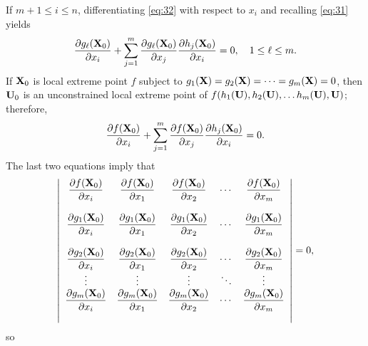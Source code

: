 \documentclass{article}
\newcommand{\dst}{\displaystyle}
\begin{document}
If $m+1\le i\le n$, differentiating \eqref{eq:32} with respect to $x_{i}$
and recalling \eqref{eq:31} yields
$$
\frac{\partial g_{\ell}({\bf X}_{0})} {\partial x_{i}} +\sum_{j=1}^{m}
\frac{\partial g_{\ell}({\bf X}_{0})}{\partial x_{j}}
\frac{\partial h_{j}({\bf X}_{0})}{\partial x_{i}}=0, \quad 1\le \ell\le m.
$$
If
 ${\bf X}_{0}$ is local extreme point   $f$
subject to  $g_{1}({\bf X})=g_{2}({\bf X})= \cdots =g_{m}({\bf X})=0$, then
${\bf U}_{0}$ is an unconstrained local extreme point of
$f(h_{1}({\bf U}),h_{2}({\bf U}), \dots h_{m}({\bf U}),{\bf U})$;
therefore,
$$
\frac{\partial f({\bf X}_{0})} {\partial x_{i}} +\sum_{j=1}^{m}
\frac{\partial f({\bf X}_{0})}{\partial x_{j}}
\frac{\partial h_{j}({\bf X}_{0})}{\partial x_{i}}=0.
$$
The last two equations imply that
$$
\left|\begin{array}{ccccccc}
\dst{\frac{\partial{f({\bf X}_{0})}}{\partial{x_{i}}}}&
\dst{\frac{\partial{f({\bf X}_{0})}}{\partial{x_{1}}}}&
\dst{\frac{\partial{f({\bf X}_{0})}}{\partial{x_{2}}}}&
\cdots&
\dst{\frac{\partial{f({\bf X}_{0})}}{\partial{x_{m}}}}\\ \\
\dst{\frac{\partial{g_{1}({\bf X}_{0})}}{\partial{x_{i}}}}&
\dst{\frac{\partial{g_{1}({\bf X}_{0})}}{\partial{x_{1}}}}&
\dst{\frac{\partial{g_{1}({\bf X}_{0})}}{\partial{x_{2}}}}&
\cdots&
\dst{\frac{\partial{g_{1}({\bf X}_{0})}}{\partial{x_{m}}}}\\ \\
\dst{\frac{\partial{g_{2}({\bf X}_{0})}}{\partial{x_{i}}}}&
\dst{\frac{\partial{g_{2}({\bf X}_{0})}}{\partial{x_{1}}}}&
\dst{\frac{\partial{g_{2}({\bf X}_{0})}}{\partial{x_{2}}}}&
\cdots&
\dst{\frac{\partial{g_{2}({\bf X}_{0})}}{\partial{x_{m}}}}\\
\vdots&\vdots&\vdots&\ddots&\vdots\\
\dst{\frac{\partial{g_{m}({\bf X}_{0})}}{\partial{x_{i}}}}&
\dst{\frac{\partial{g_{m}({\bf X}_{0})}}{\partial{x_{1}}}}&
\dst{\frac{\partial{g_{m}({\bf X}_{0})}}{\partial{x_{2}}}}&
\cdots&
\dst{\frac{\partial{g_{m}({\bf X}_{0})}}{\partial{x_{m}}}}\\ \\
\end{array}\right|=0,
$$
so
\end{document}

